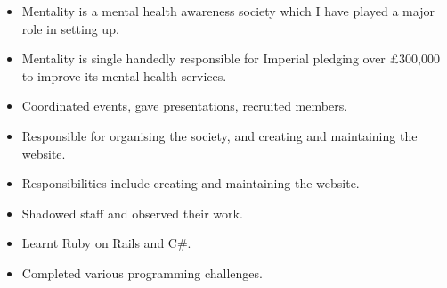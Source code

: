 \documentclass{jcgcv}
\begin{document}
\begin{column}
\begin{itemize}
  \item Mentality is a mental health awareness society which I have played a major role in setting up.
  \item Mentality is single handedly responsible for Imperial pledging over £300,000 to improve its mental health services.
  \item Coordinated events, gave presentations, recruited members.
  \item Responsible for organising the society, and creating and maintaining the website.
\end{itemize}

\begin{itemize}
  \item Responsibilities include creating and maintaining the website.
\end{itemize}

\begin{itemize}
  \item Shadowed staff and observed their work.
  \item Learnt Ruby on Rails and C\#.
  \item Completed various programming challenges.
\end{itemize}



\end{column}%
\end{document}
